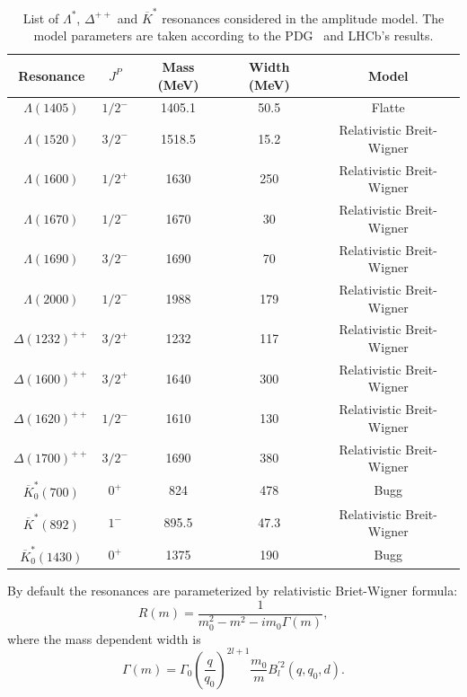 \begin{table}[htbp]
    \centering
    \caption{List of $\Lambda^*$, $\Delta^{++}$ and $\overline{K}^*$ resonances considered in the amplitude model. The model parameters are taken according to the PDG~\cite{Workman:2022ynf} and LHCb's results\cite{LHCb:2022ouv}.}
    \label{tab:parameters}
    \begin{tabular}{ccccc}
        \hline\hline
        Resonance & $J^P$ & Mass (MeV)  & Width (MeV) & Model \\\hline
        $\Lambda(1405)$ & $1/2^-$ & 1405.1 & 50.5  & Flatte \\
        $\Lambda(1520)$ & $3/2^-$ & 1518.5 & 15.2  & Relativistic Breit-Wigner\\
        $\Lambda(1600)$ & $1/2^+$ & 1630   & 250   & Relativistic Breit-Wigner\\
        $\Lambda(1670)$ & $1/2^-$ & 1670   & 30    & Relativistic Breit-Wigner\\
        $\Lambda(1690)$ & $3/2^-$ & 1690   & 70    & Relativistic Breit-Wigner\\
        $\Lambda(2000)$ & $1/2^-$ & 1988   & 179   & Relativistic Breit-Wigner\\\hline
        $\Delta(1232)^{++}$ & $3/2^+$ & 1232 & 117 & Relativistic Breit-Wigner\\
        $\Delta(1600)^{++}$ & $3/2^+$ & 1640 & 300 & Relativistic Breit-Wigner\\
        $\Delta(1620)^{++}$ & $1/2^-$ & 1610 & 130 & Relativistic Breit-Wigner\\ 
        $\Delta(1700)^{++}$ & $3/2^-$ & 1690 & 380 & Relativistic Breit-Wigner\\\hline 
        $\overline{K}^*_0(700)$  & $0^+$ & 824 & 478 & Bugg\\
        $\overline{K}^*(892)$    & $1^-$ & 895.5 & 47.3 & Relativistic Breit-Wigner\\
        $\overline{K}^*_0(1430)$ & $0^+$ & 1375  & 190  & Bugg\\ 
        \hline\hline
    \end{tabular}
\end{table}

By default the resonances are parameterized by relativistic Briet-Wigner formula:
\begin{equation}
    R(m) = \frac{1}{m_0^2 - m^2 - im_0\Gamma(m)},
\end{equation} 
where the mass dependent width is
\begin{equation}
    \label{eq:bw_width}
    \Gamma(m) = \Gamma_0\left(\frac{q}{q_0}\right)^{2l+1}\frac{m_0}{m}B_l^{\prime 2}(q,q_0,d).
\end{equation}

